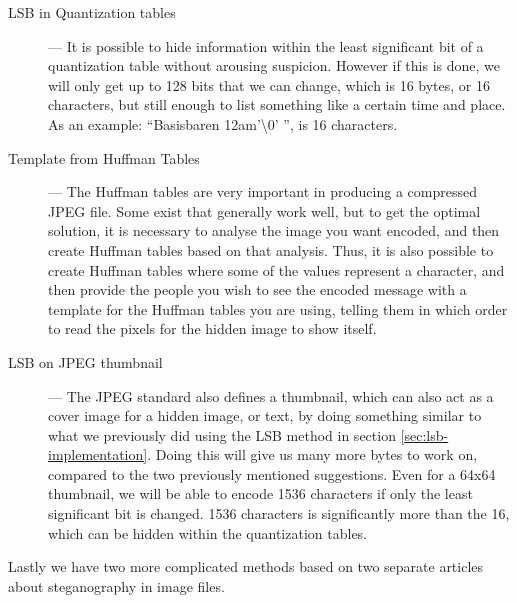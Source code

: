 \begin{description}
	\item[LSB in Quantization tables] ---
	It is possible to hide information within the least significant bit of a quantization table without arousing suspicion.
	However if this is done, we will only get up to 128 bits that we can change, which is 16 bytes, or 16 characters, but still enough to list 			something like a certain time and place.
	As an example: ``Basisbaren 12am'\textbackslash0' '', is 16 characters.
	
	\item[Template from Huffman Tables] ---
	The Huffman tables are very important in producing a compressed JPEG file.
	Some exist that generally work well, but to get the optimal solution, it is necessary to analyse the image you want encoded, and then create Huffman 		tables based on that analysis.
	Thus, it is also possible to create Huffman tables where some of the values represent a character, and then provide the people you wish to see the 			encoded	message with a template for the Huffman tables you are using, telling them in which order to read the pixels for the hidden image to show 			itself.
	
	\item[LSB on JPEG thumbnail] ---
	The JPEG standard also defines a thumbnail, which can also act as a cover image for a hidden image, or text, by doing something similar to what we previously did using the LSB method in section \ref{sec:lsb-implementation}.
	Doing this will give us many more bytes to work on, compared to the two previously mentioned suggestions.
	Even for a 64x64 thumbnail, we will be able to encode 1536 characters if only the least significant bit is changed. 1536 characters is significantly more than the 16, which can be hidden within the quantization tables.
\end{description}

\noindent Lastly we have two more complicated methods based on two separate articles about steganography in image files.  

